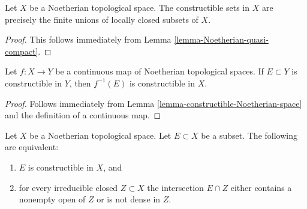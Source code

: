 \begin{lemma}
\label{lemma-constructible-Noetherian-space}
Let $X$ be a Noetherian topological space.
The constructible sets in $X$ are precisely the finite unions
of locally closed subsets of $X$.
\end{lemma}

\begin{proof}
This follows immediately from
Lemma \ref{lemma-Noetherian-quasi-compact}.
\end{proof}

\begin{lemma}
\label{lemma-constructible-map-Noetherian}
Let $f : X \to Y$ be a continuous map of Noetherian topological spaces.
If $E \subset Y$ is constructible in $Y$, then $f^{-1}(E)$ is constructible
in $X$.
\end{lemma}

\begin{proof}
Follows immediately from
Lemma \ref{lemma-constructible-Noetherian-space}
and the definition of a continuous map.
\end{proof}

\begin{lemma}
\label{lemma-characterize-constructible-Noetherian}
Let $X$ be a Noetherian topological space.
Let $E \subset X$ be a subset.
The following are equivalent:
\begin{enumerate}
\item $E$ is constructible in $X$, and
\item for every irreducible closed $Z \subset X$ the intersection
$E \cap Z$ either contains a nonempty open of $Z$ or is not dense in $Z$.
\end{enumerate}
\end{lemma}

